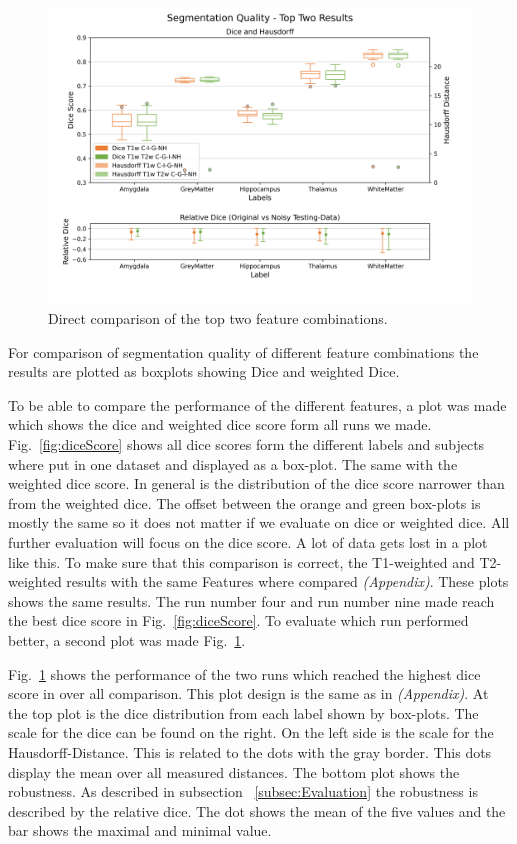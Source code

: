 \documentclass[conference]{IEEEtran}
\begin{document}
\begin{figure}[b]
  \centering
  \includegraphics[width=0.95\linewidth, trim={0 8mm 0 10mm}, clip]{04_T1W_C_I_G_NH_and_09_T1W_T2W_C_I_G_NH_zoomed}
  \caption{Direct comparison of the top two feature combinations.}
  \label{fig:bestRun}
\end{figure}

For comparison of segmentation quality of different feature combinations the results are plotted as boxplots showing Dice and weighted Dice.


To be able to compare the performance of the different features, a plot was made which shows the dice and weighted dice score form all runs we made. Fig.~\ref{fig:diceScore} shows all dice scores form the different labels and subjects where put in one dataset and displayed as a box-plot. The same with the weighted dice score. In general is the distribution of the dice score narrower than from the weighted dice. The offset between the orange and green box-plots is mostly the same so it does not matter if we evaluate on dice or weighted dice. All further evaluation will focus on the dice score.
A lot of data gets lost in a plot like this. To make sure that this comparison is correct, the T1-weighted and T2-weighted results with the same Features where compared \emph{(Appendix)}. These plots shows the same results.
The run number four and run number nine made reach the best dice score in Fig.~\ref{fig:diceScore}. To evaluate which run performed better, a second plot was made Fig.~\ref{fig:bestRun}.



Fig.~\ref{fig:bestRun} shows the performance of the two runs which reached the highest dice score in over all comparison. This plot design is the same as in \emph{(Appendix)}. At the top plot is the dice distribution from each label shown by box-plots. The scale for the dice can be found on the right. On the left side is the scale for the Hausdorff-Distance. This is related to the dots with the gray border. This dots display the mean over all measured distances. The bottom plot shows the robustness. As described in subsection ~\ref{subsec:Evaluation} the robustness is described by the relative dice. The dot shows the mean of the five values and the bar shows the maximal and minimal value.\\
\end{document}
